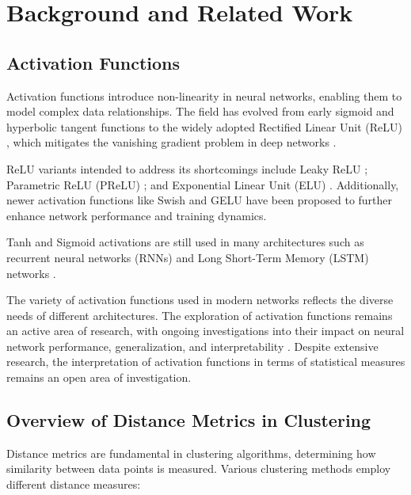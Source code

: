 \section{Background and Related Work}

\subsection{Activation Functions}

Activation functions introduce non-linearity in neural networks, enabling them to model complex data relationships. The field has evolved from early sigmoid and hyperbolic tangent functions \citep{rosenblatt1958perceptron} to the widely adopted Rectified Linear Unit (ReLU) \citep{nair2010rectified}, which mitigates the vanishing gradient problem in deep networks \citep{glorot2010understanding, krizhevsky2012imagenet}.

ReLU variants intended to address its shortcomings include Leaky ReLU \citep{maas2013rectifier}; Parametric ReLU (PReLU) \citep{he2015delving}; and Exponential Linear Unit (ELU) \citep{clevert2015fast}. Additionally, newer activation functions like Swish \citep{ramachandran2017searching} and GELU \citep{hendrycks2016gaussian} have been proposed to further enhance network performance and training dynamics.

Tanh and Sigmoid activations are still used in many architectures such as recurrent neural networks (RNNs) and Long Short-Term Memory (LSTM) networks \citep{hochreiter1997long}.

The variety of activation functions used in modern networks reflects the diverse needs of different architectures. The exploration of activation functions remains an active area of research, with ongoing investigations into their impact on neural network performance, generalization, and interpretability \citep{ramachandran2017searching}. Despite extensive research, the interpretation of activation functions in terms of statistical measures remains an open area of investigation.

\subsection{Overview of Distance Metrics in Clustering}

Distance metrics are fundamental in clustering algorithms, determining how similarity between data points is measured. Various clustering methods employ different distance measures:

